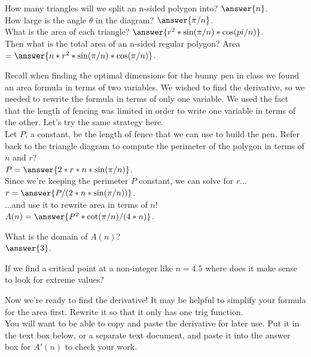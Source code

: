 \documentclass[handout,nooutcomes]{ximera}
\begin{document}
\hspace{2cm}How many triangles will we split an n-sided polygon into? $\answer{n}$.\\
How large is the angle $\theta$ in the diagram? $\answer{\pi/n}$.\\
What is the area of each triangle? $\answer{r^2*\sin(\pi/n)*\cos(pi/n)}$.\\
Then what is the total area of an n-sided regular polygon? Area $=\answer{n*r^2*\sin(\pi/n)*\cos(\pi/n)}$.\\

\bigskip

\hspace{2cm}Recall when finding the optimal dimensions for the bunny pen in class we found an area formula in terms of two variables. We wished to find the derivative, so we needed to rewrite the formula in terms of only one variable. We used the fact that the length of fencing was limited in order to write one variable in terms of the other. Let's try the same strategy here.\\
Let $P$, a constant, be the length of fence that we can use to build the pen. Refer back to the triangle diagram to compute the perimeter of the polygon in terms of $n$ and $r$?\\
$P = \answer{2*r*n*\sin(\pi/n)}$.\\
Since we're keeping the perimeter $P$ constant, we can solve for $r$...\\
$r = \answer{P/(2*n*\sin(\pi/n))}$.\\
...and use it to rewrite area in terms of $n$!\\
$A(n) = \answer{P^2*\cot(\pi/n)/(4*n)}$.\\

\bigskip

\hspace{2cm}What is the domain of $A(n)$? \\
  $\answer{3}$.\\
\begin{freeResponse}
If we find a critical point at a non-integer like $n = 4.5$ where does it make sense to look for extreme values?
\end{freeResponse}

\bigskip

\hspace{2cm}Now we're ready to find the derivative! It may be helpful to simplify your formula for the area first. Rewrite it so that it only has one trig function.\\
You will want to be able to copy and paste the derivative for later use. Put it in the text box below, or a separate text document, and paste it into the answer box for $A'(n)$ to check your work.\\
\end{document}
